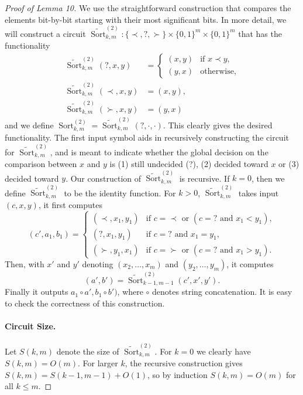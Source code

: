 \documentclass[10pt,a4paper]{article}
\newcommand{\Sort}{\operatorname{Sort}}
\newcommand{\bits}{\{0,1\}}
\begin{document}
\begin{proof}[Proof of Lemma 10]
We use the straightforward construction that compares the elements bit-by-bit starting with their most significant bits. In more detail, we will construct a circuit $\widetilde{\Sort}^{(2)}_{k,m}:\{\prec,?,\succ\}\times\bits^m\times\bits^m$ that has the functionality
\begin{align*}
\widetilde{\Sort}^{(2)}_{k,m}(?,x,y)&=\begin{cases}(x,y)&\text{if }x\prec y,\\(y,x)&\text{otherwise},\end{cases}\\
\widetilde{\Sort}^{(2)}_{k,m}(\prec,x,y)&=(x,y),\\
\widetilde{\Sort}^{(2)}_{k,m}(\succ,x,y)&=(y,x)
\end{align*}
and we define $\Sort^{(2)}_{k,m}=\widetilde{\Sort}^{(2)}_{k,m}(?,\cdot,\cdot)$. This clearly gives the desired functionality. The first input symbol aids in recursively constructing the circuit for $\widetilde{\Sort}^{(2)}_{k,m}$, and is meant to indicate whether the global decision on the comparison between $x$ and $y$ is (1) still undecided (?), (2) decided toward $x$ or (3) decided toward $y$.
Our construction of $\widetilde{\Sort}^{(2)}_{k,m}$ is recursive. If $k=0$, then we define $\widetilde{\Sort}^{(2)}_{k,m}$ to be the identity function. For $k>0$, $\widetilde{\Sort}^{(2)}_{k,m}$ takes input $(c,x,y)$, it first computes
\[(c',a_1,b_1)=\begin{cases}(\prec,x_1,y_1)&\text{if }c=\prec\text{ or }(c=?\text{ and }x_1<y_1),\\(?,x_1,y_1)&\text{if }c=?\text{ and }x_1=y_1,\\(\succ,y_1,x_1)&\text{if }c=\succ\text{ or }(c=?\text{ and }x_1>y_1).\end{cases}\]
Then, with $x'$ and $y'$ denoting $(x_2,\ldots,x_m)$ and $(y_2,\ldots,y_m)$, it computes
\[(a',b')=\widetilde{\Sort}^{(2)}_{k-1,m-1}(c',x',y').\]
Finally it outputs $a_1\circ a',b_1\circ b')$, where $\circ$ denotes string concatenation. It is easy to check the correctness of this construction.
\paragraph{Circuit Size.} Let $S(k,m)$ denote the size of $\widetilde{\Sort}^{(2)}_{k,m}$. For $k=0$ we clearly have $S(k,m)=O(m)$. For larger $k$, the recursive construction gives $S(k,m)=S(k-1,m-1)+O(1)$, so by induction $S(k,m)=O(m)$ for all $k\le m$.

\end{proof}
\end{document}
